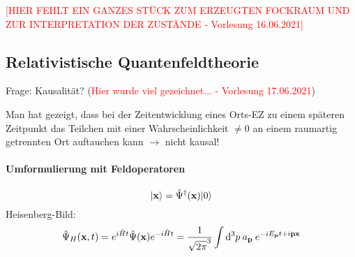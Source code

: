 \documentclass[11pt,a4paper]{report}
\begin{document}
\textcolor{red}{
[HIER FEHLT EIN GANZES STÜCK ZUM ERZEUGTEN FOCKRAUM UND ZUR INTERPRETATION DER ZUSTÄNDE - Vorlesung 16.06.2021]}

\subsection{Relativistische Quantenfeldtheorie}

Frage: Kausalität? (\textcolor{red}{Hier wurde viel gezeichnet... - Vorlesung 17.06.2021})\par 

Man hat gezeigt, dass bei der Zeitentwicklung eines Orts-EZ zu einem späteren Zeitpunkt das Teilchen mit einer Wahrscheinlichkeit $\neq 0$ an einem raumartig getrennten Ort auftauchen kann $\rightarrow$ nicht kausal!\par 

\paragraph{Umformulierung mit Feldoperatoren}

$$|\mathbf{x}\rangle=\hat{\Psi}^\dagger (\mathbf{x})|0\rangle$$
Heisenberg-Bild:
$$\hat{\Psi}_H(\mathbf{x},t)=e^{i\hat{H}t}\hat{\Psi} (\mathbf{x})e^{-i\hat{H}t} = \frac{1}{\sqrt{2\pi}^3}\int\mathrm{d}^3p\:a_{\mathbf{p}}\: e^{-iE_{\mathbf{p}}t+i\mathbf{p}\mathbf{x}}$$
\end{document}

